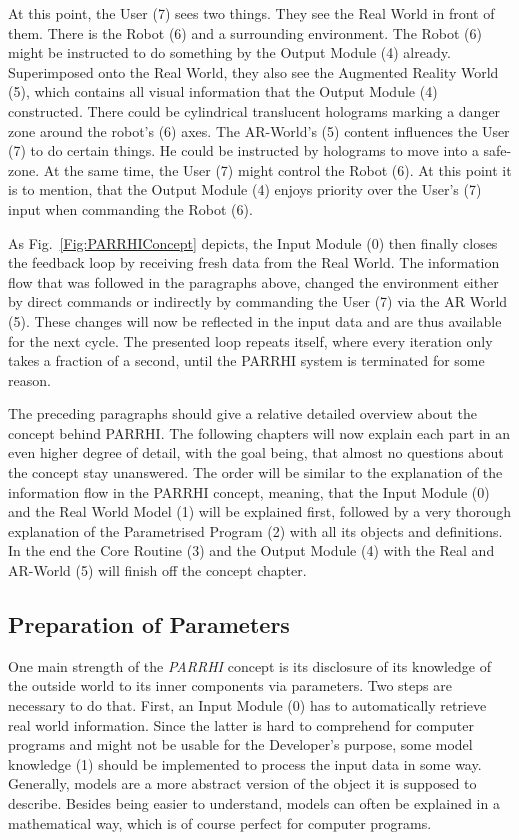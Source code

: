 At this point, the User (7) sees two things. They see the Real World in front of them. There is the Robot (6) and a surrounding environment. The Robot (6) might be instructed to do something by the Output Module (4) already. Superimposed onto the Real World, they also see the Augmented Reality World (5), which contains all visual information that the Output Module (4) constructed. There could be cylindrical translucent holograms marking a danger zone around the robot's (6) axes. The AR-World's (5) content influences the User (7) to do certain things. He could be instructed by holograms to move into a safe-zone. At the same time, the User (7) might control the Robot (6). At this point it is to mention, that the Output Module (4) enjoys priority over the User's (7) input when commanding the Robot (6).

As Fig.~\ref{Fig:PARRHIConcept} depicts, the Input Module (0) then finally closes the feedback loop by receiving fresh data from the Real World. The information flow that was followed in the paragraphs above, changed the environment either by direct commands or indirectly by commanding the User (7) via the AR World (5). These changes will now be reflected in the input data and are thus available for the next cycle. The presented loop repeats itself, where every iteration only takes a fraction of a second, until the PARRHI system is terminated for some reason. 

The preceding paragraphs should give a relative detailed overview about the concept behind PARRHI. The following chapters will now explain each part in an even higher degree of detail, with the goal being, that almost no questions about the concept stay unanswered. The order will be similar to the explanation of the information flow in the PARRHI concept, meaning, that the Input Module (0) and the Real World Model (1) will be explained first, followed by a very thorough explanation of the Parametrised Program (2) with all its objects and definitions. In the end the Core Routine (3) and the Output Module (4) with the Real and AR-World (5) will finish off the concept chapter.


\subsection{Preparation of Parameters}
One main strength of the \textit{PARRHI} concept is its disclosure of its knowledge of the outside world to its inner components via parameters. Two steps are necessary to do that. First, an Input Module (0) has to automatically retrieve real world information. Since the latter is hard to comprehend for computer programs and might not be usable for the Developer's purpose, some model knowledge (1) should be implemented to process the input data in some way. Generally, models are a more abstract version of the object it is supposed to describe. Besides being easier to understand, models can often be explained in a mathematical way, which is of course perfect for computer programs. 

